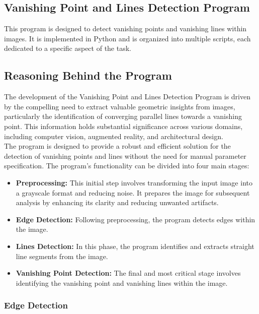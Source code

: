 \begin{multicols}{2}

\section{Vanishing Point and Lines Detection Program}
\label{sec:program}

This program is designed to detect vanishing points and vanishing lines within images.
It is implemented in Python and is organized into multiple scripts, each dedicated to a specific aspect of the task.

\subsection{Reasoning Behind the Program}
\label{subsec:reasoning}

The development of the Vanishing Point and Lines Detection Program is driven by the compelling need to extract valuable geometric insights from images,
particularly the identification of converging parallel lines towards a vanishing point.
This information holds substantial significance across various domains, including computer vision, augmented reality, and architectural design.\\
The program is designed to provide a robust and efficient solution for the detection of vanishing points and lines
without the need for manual parameter specification.
The program's functionality can be divided into four main stages:

\begin{itemize}
    \item \textbf{Preprocessing:} This initial step involves transforming the input image into a grayscale format and reducing noise.
          It prepares the image for subsequent analysis by enhancing its clarity and reducing unwanted artifacts.
    \item \textbf{Edge Detection:} Following preprocessing, the program detects edges within the image.
    \item \textbf{Lines Detection:} In this phase, the program identifies and extracts straight line segments from the image.
    \item \textbf{Vanishing Point Detection:} The final and most critical stage involves identifying the vanishing point and vanishing lines within the image.
\end{itemize}


\subsubsection{Edge Detection}
\label{subsubsec:edge-detection}


\end{multicols}
